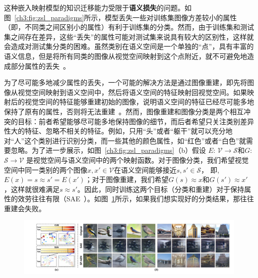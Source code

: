 这种嵌入映射模型的知识迁移能力受限于\textbf{语义损失}的问题。如图~\ref{ch3:fig:zsl_paradigms}所示，模型丢失一些对训练集图像方差较小的属性（即，不同类之间区别小的属性）有利于训练集的分类。然而，由于训练集和测试集之间存在差异，这些“丢失”的属性可能对测试集来说具有较大的区别性，这样就会造成对测试集分类的困难。虽然类别在语义空间是一个单独的“点”，具有丰富的语义信息，但是将所有同类的图像从视觉空间映射到这个点附近，就不可避免地造成部分属性的丢失~\cite{lazaridou2015hubness,fu2015transductive}。


为了尽可能多地减少属性的丢失，一个可能的解决方法是通过图像重建，即先将图像从视觉空间映射到语义空间中，然后将语义空间的特征映射回视觉空间。如果映射后的视觉空间的特征能够重建初始的图像，说明语义空间的特征已经尽可能多地保持了原有的属性，否则将无法重建~\cite{kim2017learning,yi2017dualgan,zhu2017unpaired,he2016dual}。然而，图像重建和图像分类是两个相互冲突的目标：前者希望能够尽可能多地保持图像的细节，而后者希望只关注类别差异性大的特征、忽略不相关的特征。例如，只用“头”或者“躯干”就可以充分地对“人”这个类别进行识别分类，而一些其他的颜色属性，如“红色”或者“白色”就需要忽略。为了进一步展示，如图~\ref{ch3:fig:zsl_paradigms}（b）假设 $E$: $\mathcal{V}\rightarrow \mathcal{S}$和$G$: $\mathcal{S}\rightarrow \mathcal{V}$ 是视觉空间与语义空间中的两个映射函数。对于图像分类，我们希望视觉空间中同一类别的两个图像$x, x'\in \mathcal{V}$在语义空间能够接近$s, s'\in\mathcal{S}$， 即, $E(x) = s \approx s' = E(x')$；对于图像重建，我们希望$G(s)\approx x$和$G(s')\approx x'$，这样就很难满足$s\approx s'$。因此，同时训练这两个目标（分类和重建）对于保持属性的效劳往往有限（SAE~\cite{kodirov2017semantic}）。如图~\ref{ch3:fig:reconstruction_visualization}所示，如果我们想实现好的分类结果，那往往重建会失败。


\begin{figure}[h]
    \centering
        \includegraphics[width=\linewidth]{chapter3/res/reconstruction_visualization.pdf}
    \label{ch3:fig:reconstruction_visualization}
\end{figure}

